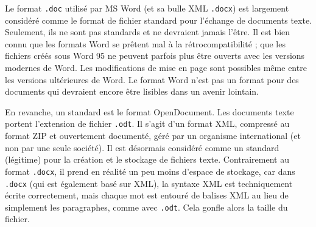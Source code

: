 \documentclass[11pt,a4paper,ngerman,french,DIV=8]{scrartcl}
\begin{document}
Le format \texttt{.doc} utilisé par MS Word (et sa bulle XML \texttt{.docx}) est largement considéré comme le format de fichier standard pour l'échange de documents texte. Seulement, ils ne sont pas standards et ne devraient jamais l’être. Il est bien connu que les formats Word se prêtent mal à la rétrocompatibilité ; que les fichiers créés sous Word 95 ne peuvent parfois plus être ouverts avec les versions modernes de Word. Les modifications de mise en page sont possibles même entre les versions ultérieures de Word. Le format Word n’est pas un format pour des documents qui devraient encore être lisibles dans un avenir lointain.

En revanche, un standard est le format OpenDocument. Les documents texte portent l'extension de fichier \texttt{.odt}. Il s'agit d'un format XML, compressé au format ZIP et ouvertement documenté, géré par un organisme international (et non par une seule société). Il est désormais considéré comme un standard (légitime) pour la création et le stockage de fichiers texte. Contrairement au format \texttt{.docx}, il prend en réalité un peu moins d'espace de stockage, car dans \texttt{.docx} (qui est également basé sur XML), la syntaxe XML est techniquement écrite correctement, mais chaque mot est entouré de balises XML au lieu de simplement les paragraphes, comme avec \texttt{.odt}. Cela gonfle alors la taille du fichier.
\end{document}
